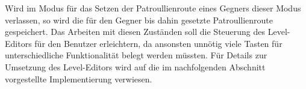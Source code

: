 Wird im Modus für das Setzen der Patroullienroute eines Gegners dieser Modus verlassen, so wird die für den Gegner bis dahin gesetzte Patroullienroute gespeichert. Das Arbeiten mit diesen Zuständen soll die Steuerung des Level-Editors für den Benutzer erleichtern, da ansonsten unnötig viele Tasten für unterschiedliche Funktionalität belegt werden müssten. Für Details zur Umsetzung des Level-Editors wird auf die im nachfolgenden Abschnitt vorgestellte Implementierung verwiesen.








